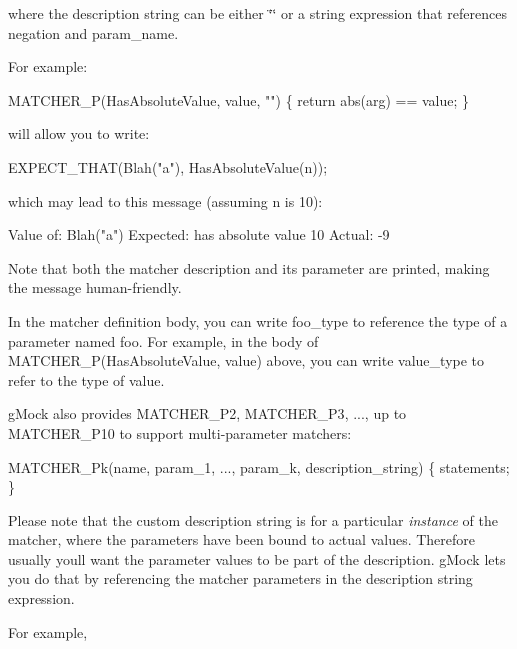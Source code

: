 where the description string can be either {\ttfamily \char`\"{}\char`\"{}} or a {\ttfamily string} expression that references {\ttfamily negation} and {\ttfamily param\+\_\+name}.

For example\+:


\begin{DoxyCode}
MATCHER\_P(HasAbsoluteValue, value, \textcolor{stringliteral}{""}) \{ \textcolor{keywordflow}{return} abs(arg) == value; \}
\end{DoxyCode}


will allow you to write\+:


\begin{DoxyCode}
EXPECT\_THAT(Blah(\textcolor{stringliteral}{"a"}), HasAbsoluteValue(n));
\end{DoxyCode}


which may lead to this message (assuming {\ttfamily n} is 10)\+:


\begin{DoxyCode}
Value of: Blah("a")
Expected: has absolute value 10
  Actual: -9
\end{DoxyCode}


Note that both the matcher description and its parameter are printed, making the message human-\/friendly.

In the matcher definition body, you can write {\ttfamily foo\+\_\+type} to reference the type of a parameter named {\ttfamily foo}. For example, in the body of {\ttfamily M\+A\+T\+C\+H\+E\+R\+\_\+\+P(\+Has\+Absolute\+Value, value)} above, you can write {\ttfamily value\+\_\+type} to refer to the type of {\ttfamily value}.

g\+Mock also provides {\ttfamily M\+A\+T\+C\+H\+E\+R\+\_\+\+P2}, {\ttfamily M\+A\+T\+C\+H\+E\+R\+\_\+\+P3}, ..., up to {\ttfamily M\+A\+T\+C\+H\+E\+R\+\_\+\+P10} to support multi-\/parameter matchers\+:


\begin{DoxyCode}
MATCHER\_Pk(name, param\_1, ..., param\_k, description\_string) \{ statements; \}
\end{DoxyCode}


Please note that the custom description string is for a particular {\itshape instance} of the matcher, where the parameters have been bound to actual values. Therefore usually you\textquotesingle{}ll want the parameter values to be part of the description. g\+Mock lets you do that by referencing the matcher parameters in the description string expression.

For example,


